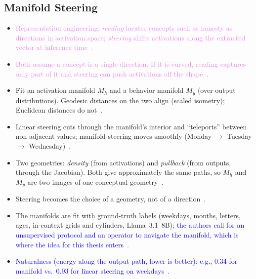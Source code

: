 \documentclass[11pt,a4paper]{article}
\newcommand{\fromextra}[1]{\textcolor{blue}{#1}}
\newcommand{\fromnotes}[1]{\textcolor{green!50!black}{#1}}
\newcommand{\fromold}[1]{\textcolor{violet}{#1}}
\newcommand{\fromextra}[1]{#1}
\newcommand{\fromnotes}[1]{#1}
\newcommand{\fromold}[1]{#1}
\begin{document}
\subsection{Manifold Steering}\label{sec:steering}
\begin{itemize}
  \item \fromold{Representation engineering: \emph{reading} locates concepts such as honesty as directions in activation space; \emph{steering} shifts activations along the extracted vector at inference time~\cite{zou2023representation}.}
  \item \fromold{Both assume a concept is a single direction. If it is curved, reading captures only part of it and steering can push activations off the shape~\cite{wurgaft2026manifoldsteering}.}
  \item Fit an activation manifold $M_h$ and a behavior manifold $M_y$ (over output distributions). Geodesic distances on the two align (scaled isometry); Euclidean distances do not~\cite{wurgaft2026manifoldsteering}.
  \item Linear steering cuts through the manifold's interior and \enquote{teleports} between non-adjacent values; manifold steering moves smoothly (Monday $\to$ Tuesday $\to$ Wednesday)~\cite{wurgaft2026manifoldsteering}.
  \item Two geometries: \emph{density} (from activations) and \emph{pullback} (from outputs, through the Jacobian). Both give approximately the same paths, so $M_h$ and $M_y$ are two images of one conceptual geometry~\cite{wurgaft2026manifoldsteering}.
  \item Steering becomes the choice of a geometry, not of a direction~\cite{wurgaft2026manifoldsteering}.
  \item \fromnotes{The manifolds are fit with ground-truth labels (weekdays, months, letters, ages, in-context grids and cylinders, Llama~3.1~8B)}; \fromextra{the authors call for an unsupervised protocol and an operator to navigate the manifold, which is where the idea for this thesis enters~\cite{wurgaft2026manifoldsteering}.}
  \item \fromextra{Naturalness (energy along the output path, lower is better): e.g., 0.34 for manifold vs.\ 0.93 for linear steering on weekdays~\cite{wurgaft2026manifoldsteering}.}
\end{itemize}

\end{document}
